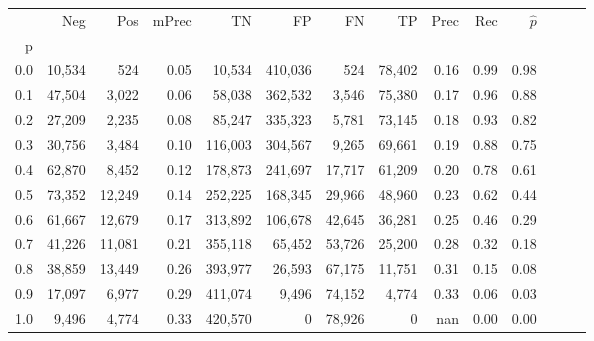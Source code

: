 \begin{tabular}{rrrrrrrrrrrrrr}
\toprule
{} &     Neg &     Pos & mPrec &       TN &       FP &      FN &      TP &  Prec &   Rec & $\hat{p}$ \\
p   &         &         &       &          &          &         &         &       &       &           \\
\midrule
0.0 &  10,534 &     524 &  0.05 &   10,534 &  410,036 &     524 &  78,402 &  0.16 &  0.99 &      0.98 \\
0.1 &  47,504 &   3,022 &  0.06 &   58,038 &  362,532 &   3,546 &  75,380 &  0.17 &  0.96 &      0.88 \\
0.2 &  27,209 &   2,235 &  0.08 &   85,247 &  335,323 &   5,781 &  73,145 &  0.18 &  0.93 &      0.82 \\
0.3 &  30,756 &   3,484 &  0.10 &  116,003 &  304,567 &   9,265 &  69,661 &  0.19 &  0.88 &      0.75 \\
0.4 &  62,870 &   8,452 &  0.12 &  178,873 &  241,697 &  17,717 &  61,209 &  0.20 &  0.78 &      0.61 \\
0.5 &  73,352 &  12,249 &  0.14 &  252,225 &  168,345 &  29,966 &  48,960 &  0.23 &  0.62 &      0.44 \\
0.6 &  61,667 &  12,679 &  0.17 &  313,892 &  106,678 &  42,645 &  36,281 &  0.25 &  0.46 &      0.29 \\
0.7 &  41,226 &  11,081 &  0.21 &  355,118 &   65,452 &  53,726 &  25,200 &  0.28 &  0.32 &      0.18 \\
0.8 &  38,859 &  13,449 &  0.26 &  393,977 &   26,593 &  67,175 &  11,751 &  0.31 &  0.15 &      0.08 \\
0.9 &  17,097 &   6,977 &  0.29 &  411,074 &    9,496 &  74,152 &   4,774 &  0.33 &  0.06 &      0.03 \\
1.0 &   9,496 &   4,774 &  0.33 &  420,570 &        0 &  78,926 &       0 &   nan &  0.00 &      0.00 \\
\bottomrule
\end{tabular}
